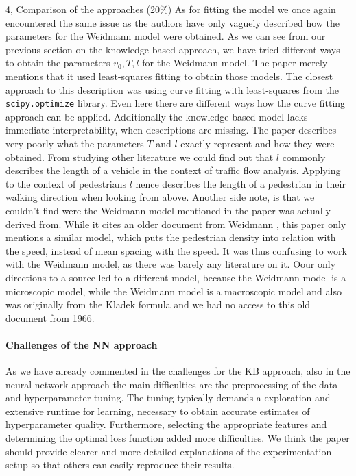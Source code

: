 \begin{task}{4, Comparison of the approaches (20\%)}
As for fitting the model we once again encountered the same issue as the authors have only vaguely described how the parameters for the Weidmann model were obtained. As we can see from our previous section on the knowledge-based approach, we have tried different ways to obtain the parameters $v_0, T, l$ for the Weidmann model. The paper merely mentions that it used least-squares fitting to obtain those models. The closest approach to this description was using curve fitting with least-squares from the \verb|scipy.optimize| library. Even here there are different ways how the curve fitting approach can be applied. Additionally the knowledge-based model lacks immediate interpretability, when descriptions are missing. The paper \cite{tordeux2020prediction} describes very poorly what the parameters $T$ and $l$ exactly represent and how they were obtained. From studying other literature \cite{treiber2013traffic} we could find out that $l$ commonly describes the length of a vehicle in the context of traffic flow analysis. Applying to the context of pedestrians $l$ hence describes the length of a pedestrian in their walking direction when looking from above. Another side note, is that we couldn't find were the Weidmann model mentioned in the paper \cite{tordeux2020prediction} was actually derived from. While it cites an older document from Weidmann \cite{weidmann1993transporttechnik}, this paper only mentions a similar model, which puts the pedestrian density into relation with the speed, instead of mean spacing with the speed. It was thus confusing to work with the Weidmann model, as there was barely any literature on it. Oour only directions to a source led to a different model, because the Weidmann model\cite{tordeux2020prediction} is a microscopic model, while the Weidmann model\cite{weidmann1993transporttechnik} is a macroscopic model and also was originally from the Kladek formula \cite{kladek1966geschwindigkeitscharakteristik} and we had no access to this old document from 1966.


\paragraph{Challenges of the NN approach} As we have already commented in the challenges for the KB approach, also in the neural network approach the main difficulties are the preprocessing of the data and hyperparameter tuning. The tuning typically demands a exploration and extensive runtime for learning, necessary to obtain accurate estimates of hyperparameter quality. Furthermore, selecting the appropriate features and determining the optimal loss function added more difficulties. We think the paper should provide clearer and more detailed explanations of the experimentation setup so that others can easily reproduce their results.
\end{task}